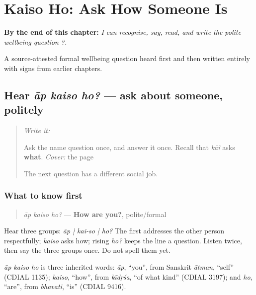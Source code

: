 
\chapter{Kaiso Ho: Ask How Someone Is}
\label{ch:mw-wellbeing-question}

\begin{chapteropening}
\textbf{By the end of this chapter:} \emph{I can recognise, say, read, and write the polite wellbeing question   ?.}

A source-attested formal wellbeing question heard first and then written entirely with signs from earlier chapters.
\end{chapteropening}

\section[āp kaiso ho?]{Hear \emph{āp kaiso ho?} — ask about someone, politely}

\label{lesson:MW-C06-hear-question}



\begin{quote}
\emph{Write it:} \textbf{}

Ask the name question once, and answer it once. Recall that \emph{kāĩ} asks \textbf{what}. \emph{Cover:} the page

The next question has a different social job.
\end{quote}

\subsection*{What to know first}
\begin{quote}
\emph{āp kaiso ho?} — \textbf{How are you?}, polite/formal
\end{quote}

Hear three groups: \emph{āp | kai-so | ho?} The first addresses the other person respectfully; \emph{kaiso} asks how; rising \emph{ho?} keeps the line a question. Listen twice, then say the three groups once. Do not spell them yet.

\begin{cousinweb}
\emph{āp kaiso ho} is three inherited words: \emph{āp}, \textquotedblleft{}you\textquotedblright{}, from Sanskrit \emph{ātman}, \textquotedblleft{}self\textquotedblright{} (CDIAL 1135); \emph{kaiso}, \textquotedblleft{}how\textquotedblright{}, from \emph{kīdṛśa}, \textquotedblleft{}of what kind\textquotedblright{} (CDIAL 3197); and \emph{ho}, \textquotedblleft{}are\textquotedblright{}, from \emph{bhavati}, \textquotedblleft{}is\textquotedblright{} (CDIAL 9416).
\end{cousinweb}

